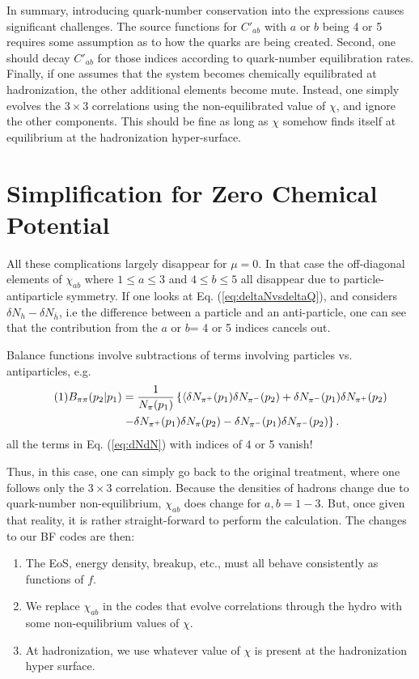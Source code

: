 \documentclass[12pt]{article}
\numberwithin{equation}{section}
\numberwithin{figure}{section}
\newcommand\eqnumber{\addtocounter{equation}{1}\tag{\theequation}}
\begin{document}
In summary, introducing quark-number conservation into the expressions causes significant challenges. The source functions for $C'_{ab}$ with $a$ or $b$ being 4 or 5 requires some assumption as to how the quarks are being created. Second, one should decay $C'_{ab}$ for those indices according to quark-number equilibration rates. Finally, if one assumes that the system becomes chemically equilibrated at hadronization, the other additional elements become mute. Instead, one simply evolves the $3\times 3$ correlations using the non-equilibrated value of $\chi$, and ignore the other components. This should be fine as long as $\chi$ somehow finds itself at equilibrium at the hadronization hyper-surface.


\section{Simplification for Zero Chemical Potential}

All these complications largely disappear for $\mu=0$. In that case the off-diagonal elements of $\chi_{ab}$ where $1\le a\le 3$ and $4\le b\le 5$ all disappear due to particle-antiparticle symmetry. If one looks at Eq. (\ref{eq:deltaNvsdeltaQ}), and considers $\delta N_h-\delta N_{\bar h}$, i.e the difference between a particle and an anti-particle, one can see that the contribution from the $a$ or $b$= 4 or 5 indices cancels out.

Balance functions involve subtractions of terms involving particles vs. antiparticles, e.g.
\begin{align*}\eqnumber
B_{\pi\pi}(p_2|p_1)&=\frac{1}{N_{\pi}(p_1)}\left\{
\langle \delta N_{\pi^+}(p_1)\delta N_{\pi^-}(p_2)+\delta N_{\pi^-}(p_1)\delta N_{\pi^+}(p_2)\right.\\
&\left.-\delta N_{\pi^+}(p_1)\delta N_{\pi}(p_2)-\delta N_{\pi^-}(p_1)\delta N_{\pi^-}(p_2)\right\}.
\end{align*}
all the terms in Eq. (\ref{eq:dNdN}) with indices of 4 or 5 vanish! 

Thus, in this case, one can simply go back to the original treatment, where one follows only the $3\times 3$ correlation. Because the densities of hadrons change due to quark-number non-equilibrium, $\chi_{ab}$ does change for $a,b=1-3$. But, once given that reality, it is rather straight-forward to perform the calculation. The changes to our BF codes are then:
\begin{enumerate}
\item The EoS, energy density, breakup, etc., must all behave consistently as functions of $f$.
\item We replace $\chi_{ab}$ in the codes that evolve correlations through the hydro with some non-equilibrium values of $\chi$.
\item At hadronization, we use whatever value of $\chi$ is present at the hadronization hyper surface.
\end{enumerate}
\end{document}
